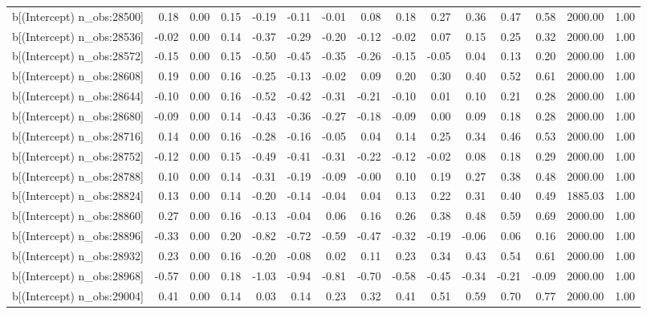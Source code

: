 \begin{table}[ht]
\begin{tabular}{rrrrrrrrrrrrrrr}
  b[(Intercept) n\_obs:28500] & 0.18 & 0.00 & 0.15 & -0.19 & -0.11 & -0.01 & 0.08 & 0.18 & 0.27 & 0.36 & 0.47 & 0.58 & 2000.00 & 1.00 \\ 
  b[(Intercept) n\_obs:28536] & -0.02 & 0.00 & 0.14 & -0.37 & -0.29 & -0.20 & -0.12 & -0.02 & 0.07 & 0.15 & 0.25 & 0.32 & 2000.00 & 1.00 \\ 
  b[(Intercept) n\_obs:28572] & -0.15 & 0.00 & 0.15 & -0.50 & -0.45 & -0.35 & -0.26 & -0.15 & -0.05 & 0.04 & 0.13 & 0.20 & 2000.00 & 1.00 \\ 
  b[(Intercept) n\_obs:28608] & 0.19 & 0.00 & 0.16 & -0.25 & -0.13 & -0.02 & 0.09 & 0.20 & 0.30 & 0.40 & 0.52 & 0.61 & 2000.00 & 1.00 \\ 
  b[(Intercept) n\_obs:28644] & -0.10 & 0.00 & 0.16 & -0.52 & -0.42 & -0.31 & -0.21 & -0.10 & 0.01 & 0.10 & 0.21 & 0.28 & 2000.00 & 1.00 \\ 
  b[(Intercept) n\_obs:28680] & -0.09 & 0.00 & 0.14 & -0.43 & -0.36 & -0.27 & -0.18 & -0.09 & 0.00 & 0.09 & 0.18 & 0.28 & 2000.00 & 1.00 \\ 
  b[(Intercept) n\_obs:28716] & 0.14 & 0.00 & 0.16 & -0.28 & -0.16 & -0.05 & 0.04 & 0.14 & 0.25 & 0.34 & 0.46 & 0.53 & 2000.00 & 1.00 \\ 
  b[(Intercept) n\_obs:28752] & -0.12 & 0.00 & 0.15 & -0.49 & -0.41 & -0.31 & -0.22 & -0.12 & -0.02 & 0.08 & 0.18 & 0.29 & 2000.00 & 1.00 \\ 
  b[(Intercept) n\_obs:28788] & 0.10 & 0.00 & 0.14 & -0.31 & -0.19 & -0.09 & -0.00 & 0.10 & 0.19 & 0.27 & 0.38 & 0.48 & 2000.00 & 1.00 \\ 
  b[(Intercept) n\_obs:28824] & 0.13 & 0.00 & 0.14 & -0.20 & -0.14 & -0.04 & 0.04 & 0.13 & 0.22 & 0.31 & 0.40 & 0.49 & 1885.03 & 1.00 \\ 
  b[(Intercept) n\_obs:28860] & 0.27 & 0.00 & 0.16 & -0.13 & -0.04 & 0.06 & 0.16 & 0.26 & 0.38 & 0.48 & 0.59 & 0.69 & 2000.00 & 1.00 \\ 
  b[(Intercept) n\_obs:28896] & -0.33 & 0.00 & 0.20 & -0.82 & -0.72 & -0.59 & -0.47 & -0.32 & -0.19 & -0.06 & 0.06 & 0.16 & 2000.00 & 1.00 \\ 
  b[(Intercept) n\_obs:28932] & 0.23 & 0.00 & 0.16 & -0.20 & -0.08 & 0.02 & 0.11 & 0.23 & 0.34 & 0.43 & 0.54 & 0.61 & 2000.00 & 1.00 \\ 
  b[(Intercept) n\_obs:28968] & -0.57 & 0.00 & 0.18 & -1.03 & -0.94 & -0.81 & -0.70 & -0.58 & -0.45 & -0.34 & -0.21 & -0.09 & 2000.00 & 1.00 \\ 
  b[(Intercept) n\_obs:29004] & 0.41 & 0.00 & 0.14 & 0.03 & 0.14 & 0.23 & 0.32 & 0.41 & 0.51 & 0.59 & 0.70 & 0.77 & 2000.00 & 1.00 \\ 

\end{tabular}
\end{table}
